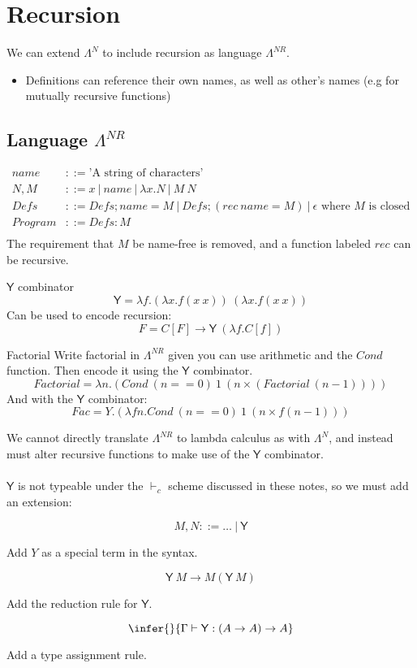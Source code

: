 \chapter{Recursion}
We can extend $\Lambda^N$ to include recursion as language $\Lambda^{NR}$.
\begin{itemize}
	\item Definitions can reference their own names, as well as other's names (e.g for mutually recursive functions)
\end{itemize}

\section{Language $\Lambda^{NR}$}
\[\begin{split}
		name & ::= \text{'A string of characters'} \\
		N, M & ::= x \ | \ name \ | \ \lambda x. N \ | \ M \ N \\
		Defs & ::= Defs ; name = M \ | \ Defs ; (rec \ name = M) \ | \ \epsilon \text{ where } M \text{ is closed}\\
		Program & ::= Defs : M \\
	\end{split}\]
The requirement that $M$ be name-free is removed, and a function labeled $rec$ can be recursive.

\begin{definitionbox}{$\mathsf{Y}$ combinator}
	\[\mathsf{Y} = \lambda f . (\lambda x . f (x \ x)) \ (\lambda x . f (x \ x))\]
	Can be used to encode recursion:
	\[F = C [F] \to \mathsf{Y} \ (\lambda f . C [f]) \]
\end{definitionbox}

\begin{examplebox}{Factorial}
	Write factorial in $\Lambda^{NR}$ given you can use arithmetic and the $Cond$ function. Then encode it using the $\mathsf{Y}$ combinator.
	\tcblower
	\[Factorial = \lambda n . (Cond \ (n == 0) \ 1 \ (n \times (Factorial \ (n - 1))) )\]
	And with the $\mathsf{Y}$ combinator:
	\[Fac = Y . (\lambda f n . Cond \ (n == 0) \ 1 \ (n \times f (n - 1)))\]
\end{examplebox}
We cannot directly translate $\Lambda^{NR}$ to lambda calculus as with $\Lambda^N$, and instead must alter recursive functions to make use of the $\mathsf{Y}$ combinator.
\\
\\ $\mathsf{Y}$ is not typeable under the $\vdash_c$ scheme discussed in these notes, so we must add an extension:
\\ \begin{minipage}[b]{.33\textwidth}
	\[M, N ::= \dots \ | \ \mathsf{Y}\]
	\centerline{Add $Y$ as a special term in the syntax.}
\end{minipage}
\begin{minipage}[b]{.33\textwidth}
	\[\mathsf{Y} \ M \to M (\mathsf{Y} \ M)\]
	\centerline{Add the reduction rule for $\mathsf{Y}$.}
\end{minipage}
\begin{minipage}[b]{.33\textwidth}
	\[\infer{}{\Gamma \vdash \mathsf{Y} : (A \to A) \to A}\]
	\centerline{Add a type assignment rule.}
\end{minipage}

